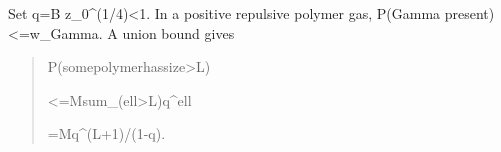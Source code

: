 \documentclass[
]{article}
\begin{document}
Set q=B z\_0\^{}(1/4)\textless1. In a positive repulsive polymer gas,
P(Gamma
p\allowbreak{}r\allowbreak{}e\allowbreak{}s\allowbreak{}e\allowbreak{}n\allowbreak{}t\allowbreak{})\allowbreak{}<\allowbreak{}=\allowbreak{}w\allowbreak{}\_\allowbreak{}G\allowbreak{}a\allowbreak{}m\allowbreak{}m\allowbreak{}a\allowbreak{}.
A union bound gives

\begin{quote}\small\ttfamily\raggedright\setlength{\parskip}{0pt}
\noindent P\allowbreak{}(\allowbreak{}s\allowbreak{}o\allowbreak{}m\allowbreak{}e\allowbreak{}\hspace*{0.525em}\allowbreak{}p\allowbreak{}o\allowbreak{}l\allowbreak{}y\allowbreak{}m\allowbreak{}e\allowbreak{}r\allowbreak{}\hspace*{0.525em}\allowbreak{}h\allowbreak{}a\allowbreak{}s\allowbreak{}\hspace*{0.525em}\allowbreak{}s\allowbreak{}i\allowbreak{}z\allowbreak{}e\allowbreak{}\hspace*{0.525em}\allowbreak{}>\allowbreak{}\hspace*{0.525em}\allowbreak{}L\allowbreak{})\par
\noindent \hspace*{0.525em}\allowbreak{}\hspace*{0.525em}\allowbreak{}\hspace*{0.525em}\allowbreak{}<\allowbreak{}=\allowbreak{}\hspace*{0.525em}\allowbreak{}M\allowbreak{}\hspace*{0.525em}\allowbreak{}s\allowbreak{}u\allowbreak{}m\allowbreak{}\_\allowbreak{}(\allowbreak{}e\allowbreak{}l\allowbreak{}l\allowbreak{}>\allowbreak{}L\allowbreak{})\allowbreak{}\hspace*{0.525em}\allowbreak{}q\allowbreak{}\^{}\allowbreak{}e\allowbreak{}l\allowbreak{}l\par
\noindent \hspace*{0.525em}\allowbreak{}\hspace*{0.525em}\allowbreak{}\hspace*{0.525em}\allowbreak{}=\allowbreak{}\hspace*{0.525em}\allowbreak{}M\allowbreak{}\hspace*{0.525em}\allowbreak{}q\allowbreak{}\^{}\allowbreak{}(\allowbreak{}L\allowbreak{}+\allowbreak{}1\allowbreak{})\allowbreak{}/\allowbreak{}(\allowbreak{}1\allowbreak{}-\allowbreak{}q\allowbreak{})\allowbreak{}.\par
\end{quote}
\end{document}
